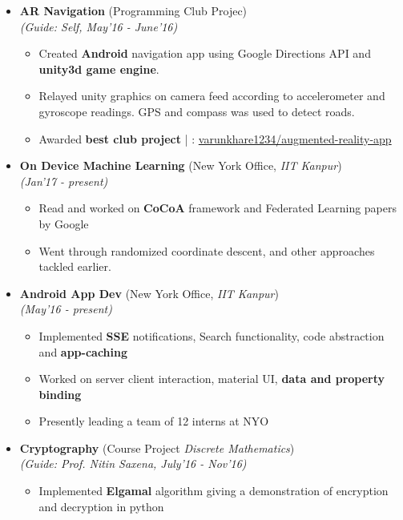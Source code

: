 \documentclass[a4paper,10pt]{article}
\newcommand{\isep}{-2 pt}
\begin{document}
\begin{itemize}
\item \textbf{AR Navigation} (Programming Club Projec) \\
 \emph{(Guide: Self, May'16 - June'16)} \\[-0.6cm]
	\begin{itemize}\itemsep \isep
	\item Created \textbf{Android} navigation app using Google Directions API and \textbf{unity3d game engine}.
	\item Relayed unity graphics on camera feed according to accelerometer and gyroscope readings. GPS and compass was used to detect roads.
	\item Awarded \textbf{best club project} | \faGithub : \href{https://github.com/varunkhare1234/augmented-reality-app}{varunkhare1234/augmented-reality-app}
	\end{itemize}
\item \textbf{On Device Machine Learning} (New York Office, \textit{IIT Kanpur}) \\
 \emph{(Jan'17 - present)} \\[-0.6cm]
	\begin{itemize}\itemsep \isep
	\item Read and worked on \textbf{CoCoA} framework and Federated Learning papers by Google
	\item Went through randomized coordinate descent, and other approaches tackled earlier.
	\end{itemize}
\item \textbf{Android App Dev} (New York Office, \textit{IIT Kanpur}) \\
 \emph{(May'16 - present)} \\[-0.6cm]
	\begin{itemize}\itemsep \isep
	\item Implemented \textbf{SSE} notifications, Search functionality, code abstraction and \textbf{app-caching}
	\item Worked on server client interaction, material UI, \textbf{data and property binding} 
	\item Presently leading a team of 12 interns at NYO
	\end{itemize}
\item \textbf{Cryptography} (Course Project \textit{Discrete Mathematics}) \\
 \emph{(Guide: Prof. Nitin Saxena, July'16 - Nov'16)} \\[-0.6cm]
	\begin{itemize}\itemsep \isep
	\item Implemented \textbf{Elgamal} algorithm giving a demonstration of encryption and decryption in python

\end{itemize}
\end{itemize}
\end{document}
